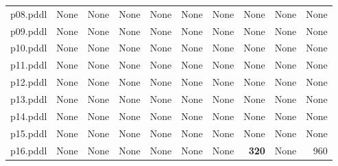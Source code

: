 \documentclass{article}
\begin{document}
\begin{tabular}{@{}lrrrrrrrrr@{}}
p08.pddl & \multicolumn{1}{|l|}{None} & \multicolumn{1}{|l|}{None} & \multicolumn{1}{|l|}{None} & \multicolumn{1}{|l|}{None} & \multicolumn{1}{|l|}{None} & \multicolumn{1}{|l|}{None} & \multicolumn{1}{|l|}{None} & \multicolumn{1}{|l|}{None} & \multicolumn{1}{|l|}{None} \\
p09.pddl & \multicolumn{1}{|l|}{None} & \multicolumn{1}{|l|}{None} & \multicolumn{1}{|l|}{None} & \multicolumn{1}{|l|}{None} & \multicolumn{1}{|l|}{None} & \multicolumn{1}{|l|}{None} & \multicolumn{1}{|l|}{None} & \multicolumn{1}{|l|}{None} & \multicolumn{1}{|l|}{None} \\
p10.pddl & \multicolumn{1}{|l|}{None} & \multicolumn{1}{|l|}{None} & \multicolumn{1}{|l|}{None} & \multicolumn{1}{|l|}{None} & \multicolumn{1}{|l|}{None} & \multicolumn{1}{|l|}{None} & \multicolumn{1}{|l|}{None} & \multicolumn{1}{|l|}{None} & \multicolumn{1}{|l|}{None} \\
p11.pddl & \multicolumn{1}{|l|}{None} & \multicolumn{1}{|l|}{None} & \multicolumn{1}{|l|}{None} & \multicolumn{1}{|l|}{None} & \multicolumn{1}{|l|}{None} & \multicolumn{1}{|l|}{None} & \multicolumn{1}{|l|}{None} & \multicolumn{1}{|l|}{None} & \multicolumn{1}{|l|}{None} \\
p12.pddl & \multicolumn{1}{|l|}{None} & \multicolumn{1}{|l|}{None} & \multicolumn{1}{|l|}{None} & \multicolumn{1}{|l|}{None} & \multicolumn{1}{|l|}{None} & \multicolumn{1}{|l|}{None} & \multicolumn{1}{|l|}{None} & \multicolumn{1}{|l|}{None} & \multicolumn{1}{|l|}{None} \\
p13.pddl & \multicolumn{1}{|l|}{None} & \multicolumn{1}{|l|}{None} & \multicolumn{1}{|l|}{None} & \multicolumn{1}{|l|}{None} & \multicolumn{1}{|l|}{None} & \multicolumn{1}{|l|}{None} & \multicolumn{1}{|l|}{None} & \multicolumn{1}{|l|}{None} & \multicolumn{1}{|l|}{None} \\
p14.pddl & \multicolumn{1}{|l|}{None} & \multicolumn{1}{|l|}{None} & \multicolumn{1}{|l|}{None} & \multicolumn{1}{|l|}{None} & \multicolumn{1}{|l|}{None} & \multicolumn{1}{|l|}{None} & \multicolumn{1}{|l|}{None} & \multicolumn{1}{|l|}{None} & \multicolumn{1}{|l|}{None} \\
p15.pddl & \multicolumn{1}{|l|}{None} & \multicolumn{1}{|l|}{None} & \multicolumn{1}{|l|}{None} & \multicolumn{1}{|l|}{None} & \multicolumn{1}{|l|}{None} & \multicolumn{1}{|l|}{None} & \multicolumn{1}{|l|}{None} & \multicolumn{1}{|l|}{None} & \multicolumn{1}{|l|}{None} \\
p16.pddl & \multicolumn{1}{|l|}{None} & \multicolumn{1}{|l|}{None} & \multicolumn{1}{|l|}{None} & \multicolumn{1}{|l|}{None} & \multicolumn{1}{|l|}{None} & \multicolumn{1}{|l|}{None} & \textbf{320} & \multicolumn{1}{|l|}{None} & 960 \\

\end{tabular}
\end{document}
